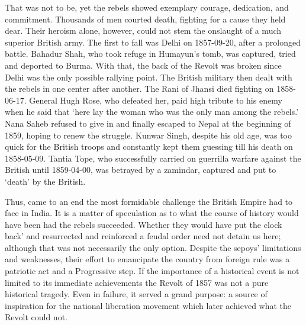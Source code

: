 \begin{multicols}{2}
That was not to be, yet the rebels showed exemplary courage, dedication, and commitment. Thousands of men courted death, fighting for a cause they held dear. Their heroism alone, however, could not stem the onslaught of a much superior British army. The first to fall was Delhi on 1857-09-20, after a prolonged battle. Bahadur Shah, who took refuge in Humayun's tomb, was captured, tried and deported to Burma. With that, the back of the Revolt was broken since Delhi was the only possible rallying point. The British military then dealt with the rebels in one center after another. The Rani of Jhansi died fighting on 1858-06-17. General Hugh Rose, who defeated her, paid high tribute to his enemy when he said that `here lay the woman who was the only man among the rebels.' Nana Saheb refused to give in and finally escaped to Nepal at the beginning of 1859, hoping to renew the struggle. Kunwar Singh, despite his old age, was too quick for the British troops and constantly kept them guessing till his death on 1858-05-09. Tantia Tope, who successfully carried on guerrilla warfare against the British until 1859-04-00, was betrayed by a zamindar, captured and put to `death' by the British.

Thus, came to an end the most formidable challenge the British Empire had to face in India. It is a matter of speculation as to what the course of history would have been had the rebels succeeded. Whether they would have put the clock back' and resurrected and reinforced a feudal order need not detain us here; although that was not necessarily the only option. Despite the sepoys' limitations and weaknesses, their effort to emancipate the country from foreign rule was a patriotic act and a Progressive step. If the importance of a historical event is not limited to its immediate achievements the Revolt of 1857 was not a pure historical tragedy. Even in failure, it served a grand purpose: a source of inspiration for the national liberation movement which later achieved what the Revolt could not.
\end{multicols}